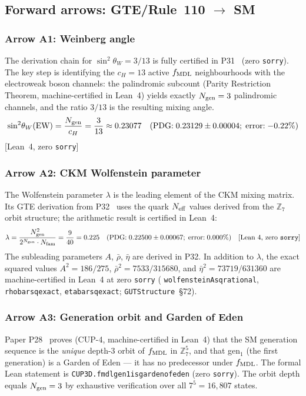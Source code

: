 \documentclass[11pt]{article}
\theoremstyle{remark}
\newcommand{\ZS}{\mathbb{Z}_7}
\newcommand{\Ngen}{N_{\rm gen}}
\newcommand{\Nfam}{N_{\rm fam}}
\newcommand{\cH}{c_H}
\newcommand{\fmdl}{f_{\rm MDL}}
\newcommand{\lean}[1]{%
  \penalty-100
  \begingroup\def\_{\textunderscore\allowbreak}\texttt{#1}\endgroup}
\newcommand{\sinwsq}{\sin^2\!\theta_W}
\newcommand{\lam}{\lambda}
\begin{document}
\subsection{Forward arrows: GTE/Rule~110 $\to$ SM}
\label{sec:arrows_forward}

\subsubsection*{Arrow A1: Weinberg angle}

The derivation chain for $\sinwsq = 3/13$ is fully certified in
P31~\cite{SpivackWeinbergAngle} (zero \texttt{sorry}).
The key step is identifying the $\cH = 13$ active $\fmdl$ neighbourhoods with the
electroweak boson channels: the palindromic subcount (Parity Restriction Theorem,
machine-certified in Lean~4) yields exactly $\Ngen = 3$ palindromic channels, and the ratio $3/13$ is
the resulting mixing angle.
\[
  \sinwsq(\text{EW}) = \frac{\Ngen}{\cH} = \frac{3}{13} \approx 0.23077
  \quad(\text{PDG:}\; 0.23129 \pm 0.00004;\; \text{error:}\; {-0.22\%})
\]
{\small [Lean~4, zero \texttt{sorry}]}

\subsubsection*{Arrow A2: CKM Wolfenstein parameter}

The Wolfenstein parameter $\lam$ is the leading element of the CKM mixing matrix.
Its GTE derivation from P32~\cite{SpivackCKM} uses the quark $N_{\rm eff}$ values
derived from the $\ZS$ orbit structure; the arithmetic result is certified in Lean~4:
\[
  \lam = \frac{\Ngen^2}{2^{\Ngen} \cdot \Nfam} = \frac{9}{40} = 0.225
  \quad(\text{PDG:}\; 0.22500 \pm 0.00067;\; \text{error:}\; 0.000\%)
  \quad [\text{Lean~4, zero \texttt{sorry}}]
\]
The subleading parameters $A$, $\bar\rho$, $\bar\eta$ are derived in P32.
In addition to $\lam$, the exact squared values $A^2 = 186/275$,
$\bar\rho^2 = 7533/315680$, and $\bar\eta^2 = 73719/631360$ are machine-certified in
Lean~4 at zero \texttt{sorry} (\lean{wolfenstein\_A\_sq\_rational},
\lean{rho\_bar\_sq\_exact}, \lean{eta\_bar\_sq\_exact}; \texttt{GUTStructure}~\S72).

\subsubsection*{Arrow A3: Generation orbit and Garden of Eden}

Paper P28~\cite{SpivackCompUniversality} proves (CUP-4, machine-certified in Lean~4) that the SM generation sequence is the \emph{unique} depth-3 orbit of $\fmdl$ in $\ZS^5$, and that gen$_1$ (the first generation) is a Garden of Eden --- it has no predecessor under $\fmdl$.
The formal Lean statement is \lean{CUP3D.fmdl\_gen1\_is\_garden\_of\_eden} (zero \texttt{sorry}).
The orbit depth equals $\Ngen = 3$ by exhaustive verification over all $7^5 = 16{,}807$ states.
\end{document}
